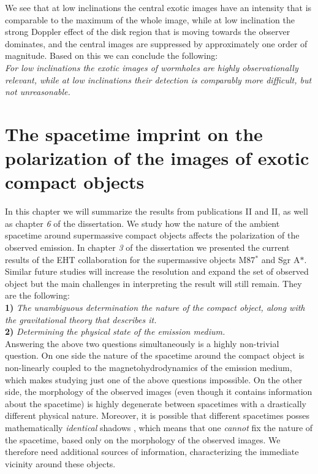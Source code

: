 \documentclass[12pt]{article}
\numberwithin{equation}{section}
\numberwithin{figure}{section}
\begin{document}
	We see that at low inclinations the central exotic images have an intensity that is comparable to the maximum of the whole image, while at low inclination the strong Doppler effect of the disk region that is moving towards the observer dominates, and the central images are suppressed by approximately one order of magnitude. Based on this we can conclude the following:\\
	
	\emph{For low inclinations the exotic images of wormholes are \emph{highly} observationally relevant, while at low inclinations their detection is comparably more difficult, but not unreasonable.}
	
	\newpage
	
	\section{The spacetime imprint on the polarization of the images of exotic compact objects}
	
	In this chapter we will summarize the results from publications II and II, as well as chapter \emph{6} of the dissertation. We study how the nature of the ambient spacetime around supermassive compact objects affects the polarization of the observed emission. In chapter \emph{3} of the dissertation we presented the current results of the EHT collaboration for the supermassive objects M87$^*$ and Sgr A$*$. Similar future studies will increase the resolution and expand the set of observed object but the main challenges in interpreting the result will still remain. They are the following:\\
	
	\textbf{1)} \emph{The unambiguous determination the nature of the compact object, along with the gravitational theory that describes it.}\\
	
	\textbf{2)} \emph{Determining the physical state of the emission medium.}\\
	
	Answering the above two questions simultaneously is a highly non-trivial question. On one side the nature of the spacetime  around the compact object is non-linearly coupled to the magnetohydrodynamics of the emission medium, which makes studying just one of the above questions impossible. On the other side, the morphology of the observed images (even though it contains information about the spacetime) is highly degenerate between spacetimes with a drastically different physical nature. Moreover, it is possible that different spacetimes posses mathematically \emph{identical} shadows \cite{PhysRevD.103.084040}, which means that one \emph{cannot} fix the nature of the spacetime, based only on the morphology of the observed images. We therefore need additional sources of information, characterizing the immediate vicinity around these objects.\\
	
\end{document}
